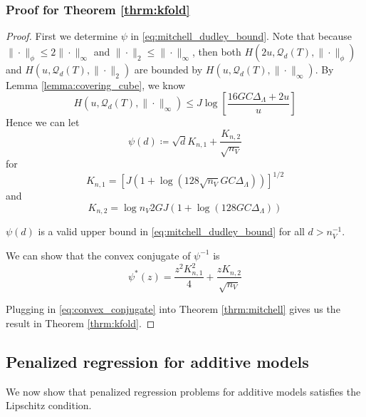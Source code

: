 \documentclass[12pt]{article}
\begin{document}
\subsubsection{Proof for Theorem \ref{thrm:kfold}}
\begin{proof}
	First we determine $\psi$ in \eqref{eq:mitchell_dudley_bound}. Note that because $\|\cdot\|_\phi \le 2\|\cdot \|_\infty $ and $\| \cdot \|_2 \le \| \cdot \|_\infty$, then both $H(2u,\mathcal{Q}_{d}(T),\|\cdot\|_{\phi})$ and $H(u,\mathcal{Q}_{d}(T),\|\cdot\|_2)$ are bounded by 
	$H(u,\mathcal{Q}_{d}(T),\|\cdot\|_{\infty})$.
	By Lemma \ref{lemma:covering_cube}, we know
	\begin{equation}
	H(u,\mathcal{Q}_{d}(T),\|\cdot\|_{\infty}) \le J \log\left [
	\frac{16GC\Delta_{\Lambda} + 2u}{u}
	\right ]
	\end{equation}
	Hence we can let
	\begin{equation}
	\psi(d) \coloneqq
	\sqrt{d}K_{n,1}
	+
	\frac{K_{n,2}}{\sqrt{n_V}} 
	\end{equation}
	for $$K_{n,1} = \left[J\left(1+\log\left(128\sqrt{n_V} GC \Delta_{\Lambda} \right)\right)\right]^{1/2}$$ and $$K_{n,2} = \log n_V 2GJ\left(1+\log\left(128GC \Delta_{\Lambda} \right)\right)$$
	
	$\psi(d)$ is a valid upper bound in \eqref{eq:mitchell_dudley_bound}  for all $d > n_V^{-1}$.
	
	We can show that the convex conjugate of $\psi^{-1}$ is
	\begin{equation}
	\label{eq:convex_conjugate}
	\psi^*(z) = \frac{z^2 K_{n,1}^2}{4} + \frac{z K_{n,2}}{\sqrt{n_V}}
	\end{equation}	
	
	Plugging in \eqref{eq:convex_conjugate} into Theorem \ref{thrm:mitchell} gives us the result in Theorem \ref{thrm:kfold}.
\end{proof}

\subsection{Penalized regression for additive models}

We now show that penalized regression problems for additive models satisfies the Lipschitz condition.
\end{document}
